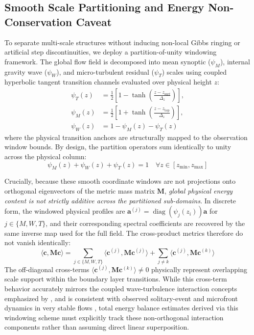 \subsection{Smooth Scale Partitioning and Energy Non-Conservation Caveat}
\label{sec:methods:partition}

To separate multi-scale structures without inducing non-local Gibbs ringing or artificial step discontinuities, we deploy a partition-of-unity windowing framework. The global flow field is decomposed into mean synoptic ($\psi_M$), internal gravity wave ($\psi_W$), and micro-turbulent residual ($\psi_T$) scales using coupled hyperbolic tangent transition channels evaluated over physical height $z$:
\begin{equation}
\begin{aligned}
  \psi_T(z) &= \frac{1}{2}\left[1 - \tanh\left(\frac{z - z_{\mathrm{surf}}}{\Delta_z}\right)\right], \\
  \psi_M(z) &= \frac{1}{2}\left[1 + \tanh\left(\frac{z - z_{\mathrm{top}}}{\Delta_z}\right)\right], \\
  \psi_W(z) &= 1 - \psi_M(z) - \psi_T(z)
\end{aligned}
\label{eq:partition_scales_def}
\end{equation}
where the physical transition anchors are structurally mapped to the observation window bounds. By design, the partition operators sum identically to unity across the physical column:
\begin{equation}
\psi_M(z) + \psi_W(z) + \psi_T(z) = 1 \quad \forall z \in [z_{\min}, z_{\max}]
\label{eq:partition_unity}
\end{equation}

Crucially, because these smooth coordinate windows are not projections onto orthogonal eigenvectors of the metric mass matrix $\mathbf{M}$, \emph{global physical energy content is not strictly additive across the partitioned sub-domains}. In discrete form, the windowed physical profiles are $\mathbf{a}^{(j)} = \operatorname{diag}(\psi_j(z_i))\mathbf{a}$ for $j\in\{M,W,T\}$, and their corresponding spectral coefficients are recovered by the same inverse map used for the full field. The cross-product metrics therefore do not vanish identically:
\begin{equation}
\langle \mathbf{c}, \mathbf{M} \mathbf{c} \rangle = \sum_{j \in \{M,W,T\}} \langle \mathbf{c}^{(j)}, \mathbf{M} \mathbf{c}^{(j)} \rangle + \sum_{j \neq k} \langle \mathbf{c}^{(j)}, \mathbf{M} \mathbf{c}^{(k)} \rangle
\label{eq:energy_overlap}
\end{equation}
The off-diagonal cross-terms $\langle \mathbf{c}^{(j)}, \mathbf{M} \mathbf{c}^{(k)} \rangle \neq 0$ physically represent overlapping scale support within the boundary layer transitions. While this cross-term behavior accurately mirrors the coupled wave-turbulence interaction concepts emphasized by \citet{Sun2015}, and is consistent with observed solitary-event and microfront dynamics in very stable flows \citep{Mahrt2010}, total energy balance estimates derived via this windowing scheme must explicitly track these non-orthogonal interaction components rather than assuming direct linear superposition.

